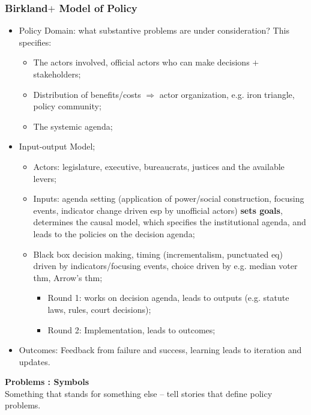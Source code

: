 \documentclass[aspectratio=169]{beamer}
\theoremstyle{principle}
\begin{document}
\begin{frame}
\frametitle{Birkland$+$ Model of Policy}
\begin{itemize}
\item Policy Domain: what substantive problems are under consideration?  This specifies:
\begin{itemize}
\item The actors involved, official actors who can make decisions $+$ stakeholders; 
\item Distribution of benefits/costs $\Rightarrow$ actor organization, e.g. iron triangle, policy community;
\item The systemic agenda; 
\end{itemize}
\bigskip
\item \color{black}Input-output Model;
\begin{itemize}
\item Actors: legislature, executive, bureaucrats, justices and the available levers;
\item Inputs: agenda setting (application of power/social construction, focusing events, indicator change driven esp by unofficial actors) \textbf{sets goals}, determines the causal model, which specifies the institutional agenda, and leads to the policies on the decision agenda;
\item Black box decision making, timing (incrementalism, punctuated eq) driven by indicators/focusing events, choice driven by e.g. median voter thm, Arrow's thm;
\begin{itemize}
\item Round 1: works on decision agenda, leads to outputs (e.g. statute laws, rules, court decisions);
\item Round 2: Implementation, leads to outcomes;
 \end{itemize}
\end{itemize}
\bigskip
\item Outcomes: Feedback from failure and success, learning leads to iteration and updates.
\end{itemize}
\end{frame}

\begin{frame}

\begin{center}
\Huge\textbf{Problems : Symbols}\\
\bigskip
\bigskip
\large Something that stands for something else -- tell stories that define policy problems.
\end{center}
\end{frame}
\end{document}
